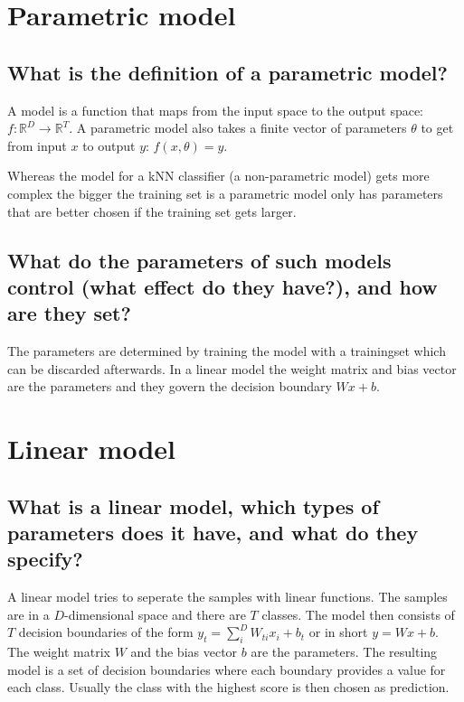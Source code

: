 \section{Parametric model}
\subsection{What is the definition of a parametric model?}
A model is a function that maps from the input space to the output space: $f:\mathbb R^D \to \mathbb R^T$. A parametric model also takes a finite vector of parameters $\theta$ to get from input $x$ to output $y$: $f(x,\theta) = y$.

Whereas the model for a kNN classifier (a non-parametric model) gets more complex the bigger the training set is a parametric model only has parameters that are better chosen if the training set gets larger. 
\subsection{What do the parameters of such models control (what effect do they have?), and how are they set?}
The parameters are determined by training the model with a trainingset which can be discarded afterwards. In a linear model the weight matrix and bias vector are the parameters and they govern the decision boundary $Wx + b$. 
%
\section{Linear model}
\subsection{What is a linear model, which types of parameters does it have, and what do they specify?}
A linear model tries to seperate the samples with linear functions. The samples are in a $D$-dimensional space and there are $T$ classes. The model then consists of $T$ decision boundaries of the form $y_t = \sum_i^D W_{ti} x_i + b_t$ or in short $y = Wx + b$. The weight matrix $W$ and the bias vector $b$ are the parameters. The resulting model is a set of decision boundaries where each boundary provides a value for each class. Usually the class with the highest score is then chosen as prediction. 

